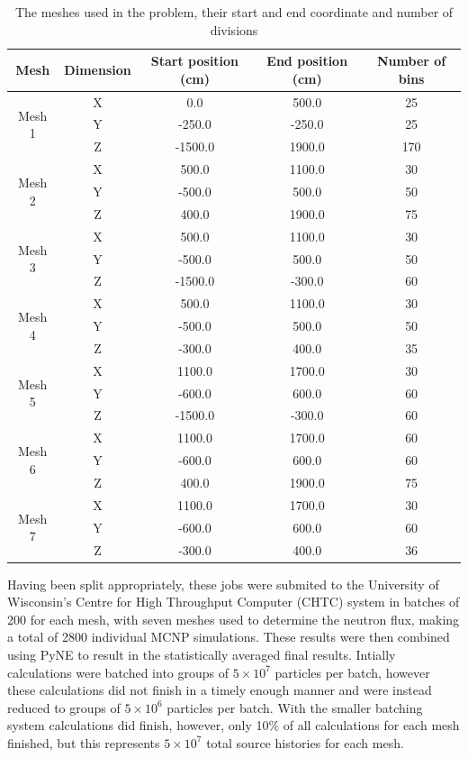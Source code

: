 \documentclass[12pt]{article}
\begin{document}
\begin{centering}
 \begin{table}[ht!]
  \begin{tabular}{c | c | c | c | c}
  \hline 
  Mesh & Dimension & Start position (cm) & End position (cm) & Number of bins\\
  \hline 
  \multirow{3}{*}{Mesh 1} & X & 0.0 & 500.0 & 25 \\ & Y & -250.0 & -250.0 & 25 \\ & Z & -1500.0 & 1900.0 & 170 \\
  \hline
  \multirow{3}{*}{Mesh 2} & X & 500.0 & 1100.0 & 30 \\ & Y & -500.0 & 500.0 & 50 \\ & Z & 400.0 & 1900.0 & 75 \\
  \hline
  \multirow{3}{*}{Mesh 3} & X & 500.0 & 1100.0 & 30 \\ & Y & -500.0 & 500.0 & 50 \\ & Z & -1500.0 & -300.0 & 60 \\
  \hline
  \multirow{3}{*}{Mesh 4} & X & 500.0 & 1100.0 & 30 \\ & Y & -500.0 & 500.0 & 50 \\ & Z & -300.0 & 400.0 & 35 \\
  \hline
  \multirow{3}{*}{Mesh 5} & X & 1100.0 & 1700.0 & 30 \\ & Y & -600.0 & 600.0 & 60 \\ & Z & -1500.0 & -300.0 & 60 \\
  \hline
  \multirow{3}{*}{Mesh 6} & X & 1100.0 & 1700.0 & 60 \\ & Y & -600.0 & 600.0 & 60 \\ & Z & 400.0 & 1900.0 & 75\\
  \hline
  \multirow{3}{*}{Mesh 7} & X & 1100.0 & 1700.0 & 30 \\ & Y & -600.0 & 600.0 & 60 \\ & Z & -300.0 & 400.0 & 36 
  \end{tabular}
 \caption{The meshes used in the problem, their start and end coordinate and number of divisions}
 \label{table:mesh_sizes}
 \end{table}
\end{centering}

Having been split appropriately, these jobs were submited to the University of Wisconsin's Centre for High Throughput Computer (CHTC) system in batches of 200 for each mesh, with seven meshes used to determine the neutron flux, making a total of 2800 individual MCNP simulations. These results were then combined using PyNE to result in the statistically averaged final results. Intially calculations were batched into groups of $5\times10^7$ particles per batch, however these calculations did not finish in a timely enough manner and were instead reduced to groups of $5\times10^6$ particles per batch. With the smaller batching system calculations did finish, however, only 10\% of all calculations for each mesh finished, but this represents $5\times10^7$ total source histories for each mesh. 
\newpage
\clearpage
\end{document}
